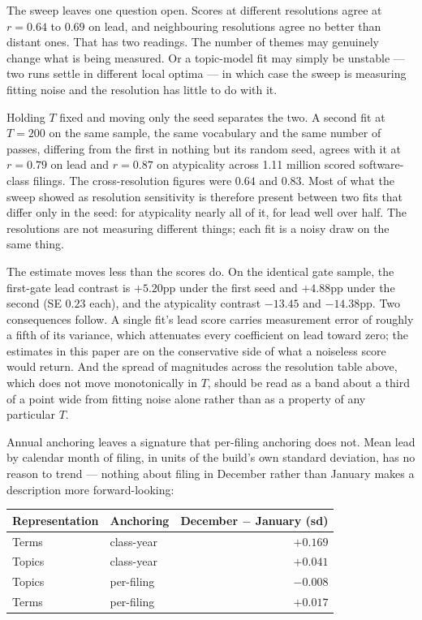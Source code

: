 \documentclass[11pt]{article}
\begin{document}
The sweep leaves one question open. Scores at different resolutions agree at
$r = 0.64$ to $0.69$ on lead, and neighbouring resolutions agree no better than
distant ones. That has two readings. The number of themes may genuinely change
what is being measured. Or a topic-model fit may simply be unstable --- two
runs settle in different local optima --- in which case the sweep is measuring
fitting noise and the resolution has little to do with it.

Holding $T$ fixed and moving only the seed separates the two. A second fit at
$T = 200$ on the same sample, the same vocabulary and the same number of
passes, differing from the first in nothing but its random seed, agrees with
it at $r = 0.79$ on lead and $r = 0.87$ on atypicality across 1.11 million
scored software-class filings. The cross-resolution figures were $0.64$ and
$0.83$. Most of what the sweep showed as resolution sensitivity is therefore
present between two fits that differ only in the seed: for atypicality nearly
all of it, for lead well over half. The resolutions are not measuring
different things; each fit is a noisy draw on the same thing.

The estimate moves less than the scores do. On the identical gate sample, the
first-gate lead contrast is $+5.20$pp under the first seed and $+4.88$pp under
the second (SE $0.23$ each), and the atypicality contrast $-13.45$ and
$-14.38$pp. Two consequences follow. A single fit's lead score carries
measurement error of roughly a fifth of its variance, which attenuates every
coefficient on lead toward zero; the estimates in this paper are on the
conservative side of what a noiseless score would return. And the spread of
magnitudes across the resolution table above, which does not move
monotonically in $T$, should be read as a band about a third of a point wide
from fitting noise alone rather than as a property of any particular $T$.

Annual anchoring leaves a signature that per-filing anchoring does not. Mean
lead by calendar month of filing, in units of the build's own standard
deviation, has no reason to trend --- nothing about filing in December rather
than January makes a description more forward-looking:

\begin{center}\small
\begin{tabular}{llr}
\toprule
Representation & Anchoring & December $-$ January (sd) \\
\midrule
Terms  & class-year & $+0.169$ \\
Topics & class-year & $+0.041$ \\
Topics & per-filing & $-0.008$ \\
Terms  & per-filing & $+0.017$ \\
\bottomrule
\end{tabular}
\end{center}
\end{document}

